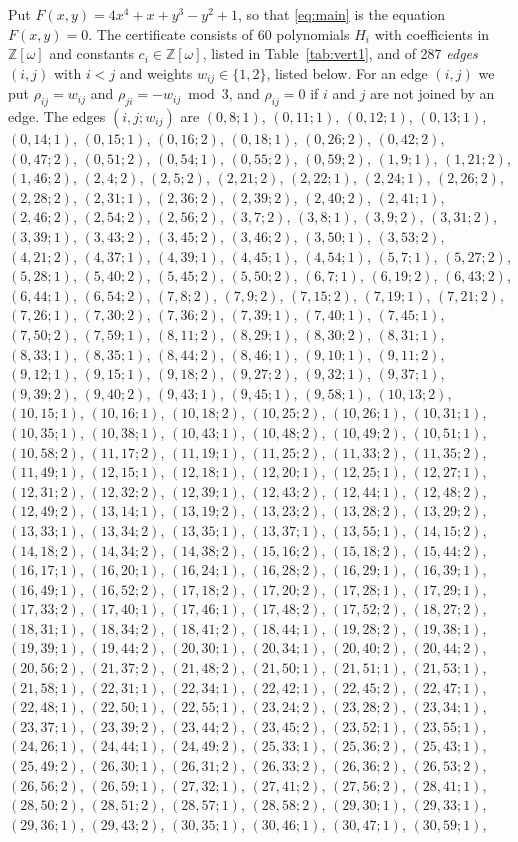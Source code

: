\documentclass[11pt]{article}
\newcommand{\Z}{\mathbb{Z}}
\begin{document}
Put $F(x,y)=4x^{4}+x+y^{3}-y^{2}+1$, so that \eqref{eq:main} is the equation $F(x,y)=0$. The certificate consists of 60 polynomials $H_i$ with coefficients in $\Z[\omega]$ and constants $c_i\in\Z[\omega]$, listed in Table~\ref{tab:vert1}, and of 287 \emph{edges} $(i,j)$ with $i<j$ and weights $w_{ij}\in\{1,2\}$, listed below. For an edge $(i,j)$ we put $\rho_{ij}=w_{ij}$ and $\rho_{ji}=-w_{ij}\bmod 3$, and $\rho_{ij}=0$ if $i$ and $j$ are not joined by an edge.
The edges $(i,j;w_{ij})$ are $(0,8;1)$, $(0,11;1)$, $(0,12;1)$, $(0,13;1)$, $(0,14;1)$, $(0,15;1)$, $(0,16;2)$, $(0,18;1)$, $(0,26;2)$, $(0,42;2)$, $(0,47;2)$, $(0,51;2)$, $(0,54;1)$, $(0,55;2)$, $(0,59;2)$, $(1,9;1)$, $(1,21;2)$, $(1,46;2)$, $(2,4;2)$, $(2,5;2)$, $(2,21;2)$, $(2,22;1)$, $(2,24;1)$, $(2,26;2)$, $(2,28;2)$, $(2,31;1)$, $(2,36;2)$, $(2,39;2)$, $(2,40;2)$, $(2,41;1)$, $(2,46;2)$, $(2,54;2)$, $(2,56;2)$, $(3,7;2)$, $(3,8;1)$, $(3,9;2)$, $(3,31;2)$, $(3,39;1)$, $(3,43;2)$, $(3,45;2)$, $(3,46;2)$, $(3,50;1)$, $(3,53;2)$, $(4,21;2)$, $(4,37;1)$, $(4,39;1)$, $(4,45;1)$, $(4,54;1)$, $(5,7;1)$, $(5,27;2)$, $(5,28;1)$, $(5,40;2)$, $(5,45;2)$, $(5,50;2)$, $(6,7;1)$, $(6,19;2)$, $(6,43;2)$, $(6,44;1)$, $(6,54;2)$, $(7,8;2)$, $(7,9;2)$, $(7,15;2)$, $(7,19;1)$, $(7,21;2)$, $(7,26;1)$, $(7,30;2)$, $(7,36;2)$, $(7,39;1)$, $(7,40;1)$, $(7,45;1)$, $(7,50;2)$, $(7,59;1)$, $(8,11;2)$, $(8,29;1)$, $(8,30;2)$, $(8,31;1)$, $(8,33;1)$, $(8,35;1)$, $(8,44;2)$, $(8,46;1)$, $(9,10;1)$, $(9,11;2)$, $(9,12;1)$, $(9,15;1)$, $(9,18;2)$, $(9,27;2)$, $(9,32;1)$, $(9,37;1)$, $(9,39;2)$, $(9,40;2)$, $(9,43;1)$, $(9,45;1)$, $(9,58;1)$, $(10,13;2)$, $(10,15;1)$, $(10,16;1)$, $(10,18;2)$, $(10,25;2)$, $(10,26;1)$, $(10,31;1)$, $(10,35;1)$, $(10,38;1)$, $(10,43;1)$, $(10,48;2)$, $(10,49;2)$, $(10,51;1)$, $(10,58;2)$, $(11,17;2)$, $(11,19;1)$, $(11,25;2)$, $(11,33;2)$, $(11,35;2)$, $(11,49;1)$, $(12,15;1)$, $(12,18;1)$, $(12,20;1)$, $(12,25;1)$, $(12,27;1)$, $(12,31;2)$, $(12,32;2)$, $(12,39;1)$, $(12,43;2)$, $(12,44;1)$, $(12,48;2)$, $(12,49;2)$, $(13,14;1)$, $(13,19;2)$, $(13,23;2)$, $(13,28;2)$, $(13,29;2)$, $(13,33;1)$, $(13,34;2)$, $(13,35;1)$, $(13,37;1)$, $(13,55;1)$, $(14,15;2)$, $(14,18;2)$, $(14,34;2)$, $(14,38;2)$, $(15,16;2)$, $(15,18;2)$, $(15,44;2)$, $(16,17;1)$, $(16,20;1)$, $(16,24;1)$, $(16,28;2)$, $(16,29;1)$, $(16,39;1)$, $(16,49;1)$, $(16,52;2)$, $(17,18;2)$, $(17,20;2)$, $(17,28;1)$, $(17,29;1)$, $(17,33;2)$, $(17,40;1)$, $(17,46;1)$, $(17,48;2)$, $(17,52;2)$, $(18,27;2)$, $(18,31;1)$, $(18,34;2)$, $(18,41;2)$, $(18,44;1)$, $(19,28;2)$, $(19,38;1)$, $(19,39;1)$, $(19,44;2)$, $(20,30;1)$, $(20,34;1)$, $(20,40;2)$, $(20,44;2)$, $(20,56;2)$, $(21,37;2)$, $(21,48;2)$, $(21,50;1)$, $(21,51;1)$, $(21,53;1)$, $(21,58;1)$, $(22,31;1)$, $(22,34;1)$, $(22,42;1)$, $(22,45;2)$, $(22,47;1)$, $(22,48;1)$, $(22,50;1)$, $(22,55;1)$, $(23,24;2)$, $(23,28;2)$, $(23,34;1)$, $(23,37;1)$, $(23,39;2)$, $(23,44;2)$, $(23,45;2)$, $(23,52;1)$, $(23,55;1)$, $(24,26;1)$, $(24,44;1)$, $(24,49;2)$, $(25,33;1)$, $(25,36;2)$, $(25,43;1)$, $(25,49;2)$, $(26,30;1)$, $(26,31;2)$, $(26,33;2)$, $(26,36;2)$, $(26,53;2)$, $(26,56;2)$, $(26,59;1)$, $(27,32;1)$, $(27,41;2)$, $(27,56;2)$, $(28,41;1)$, $(28,50;2)$, $(28,51;2)$, $(28,57;1)$, $(28,58;2)$, $(29,30;1)$, $(29,33;1)$, $(29,36;1)$, $(29,43;2)$, $(30,35;1)$, $(30,46;1)$, $(30,47;1)$, $(30,59;1)$, 
\end{document}
